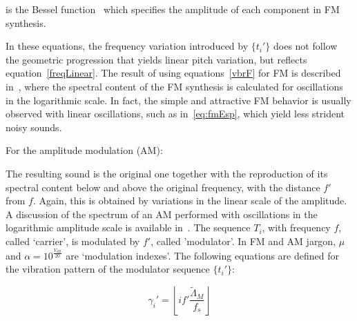 \noindent is the Bessel function~\cite{BesselCCRMA,JOSFM} which specifies the amplitude of each component in FM synthesis.

In these equations, the frequency variation introduced by $\{t_i'\}$ does not follow the geometric progression that yields linear pitch variation, but reflects equation~\ref{freqLinear}. The result of using equations~\ref{vbrF} for FM is described in~\cite{dissertacao}, where the spectral content of the FM synthesis is calculated for oscillations in the logarithmic scale. In fact, the simple and attractive FM behavior is usually observed with linear oscillations, such as in~\ref{eq:fmEsp}, which yield less strident noisy sounds.

For the amplitude modulation (AM):

\newcommand{\OneColEqu}[1]{%
\end{multicols}%
\begin{twocolequfloat}%
\begin{equation}
\{t_i'\}_0^{\Lambda-1} =\{(1+a_i) . t_i\}_0^{\Lambda-1} = \left \{ \left [ 1+M.\sin \left ( f'.2\pi\frac{i}{f_s -1} \right ) \right] .P .\sin \left ( f.2\pi\frac{i}{f_s -1} \right ) \right \}_0^{\Lambda-1} = \\ 
                        =  \left\{P.\sin \left( f.2\pi\frac{i}{f_s -1}  \right ) +  \frac{P.M}{2} \left [ \sin \left( (f-f').2\pi\frac{i}{f_s -1}  \right )  + \sin \left( (f+f').2\pi\frac{i}{f_s -1}  \right ) \right ] \right \}_0^{\Lambda-1}
\end{equation}
\end{twocolequfloat}%
\begin{multicols}{2}%
}

The resulting sound is the original one together with the
reproduction of its spectral content below and above the original frequency, with the distance $f'$ from $f$. Again, this is obtained by variations in the linear scale of the amplitude. A discussion of the
spectrum of an AM performed with oscillations in the logarithmic amplitude scale is available in~\cite{dissertacao}. The sequence $T_i$, with frequency $f$, called `carrier', is modulated by
$f'$, called 'modulator'. In FM and AM jargon, $\mu$ and
$\alpha=10^{\frac{V_{dB}}{20}}$ are `modulation indexes'. The following equations are defined for the vibration pattern of the modulator sequence $\{t_i'\}$:

\begin{equation}\label{fmGammaAux}
\gamma_i'=\left \lfloor i f' \frac{\widetilde{\Lambda}_M}{f_s} \right \rfloor
\end{equation}

